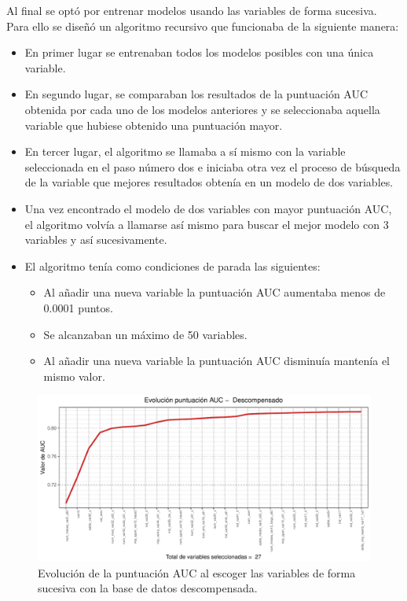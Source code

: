 \documentclass[11pt,a4paper,spanish]{article} %
\begin{document}
Al final se optó por entrenar modelos usando las variables de forma sucesiva. Para ello se diseñó un algoritmo recursivo que funcionaba de la siguiente manera:

\begin{itemize}

	\item{En primer lugar se entrenaban todos los modelos posibles con una única variable.}
	
	\item{En segundo lugar, se comparaban los resultados de la puntuación AUC obtenida por cada uno de los modelos anteriores y se seleccionaba aquella variable que hubiese obtenido una puntuación mayor.}
	
	\item{En tercer lugar, el algoritmo se llamaba a sí mismo con la variable seleccionada en el paso número dos e iniciaba otra vez el proceso de búsqueda de la variable que mejores resultados obtenía en un modelo de dos variables.}
	
	\item{Una vez encontrado el modelo de dos variables con mayor puntuación AUC, el algoritmo volvía a llamarse así mismo para buscar el mejor modelo con 3 variables y así sucesivamente.}
	
	\item{El algoritmo tenía como condiciones de parada las siguientes:}
		\begin{itemize} 
			\item{Al añadir una nueva variable la puntuación AUC aumentaba menos de 0.0001 puntos.}
			\item{Se alcanzaban un máximo de 50 variables.}
			\item{Al añadir una nueva variable la puntuación AUC disminuía mantenía el mismo valor.}
		\end{itemize}
\end{itemize}





\begin{figure}[h!]
	\begin{center}
	\includegraphics[width=\textwidth]{Z_02_01_Descompensado.pdf}
    \caption{Evolución de la puntuación AUC al escoger las variables de forma sucesiva con la base de datos descompensada.}
    \end{center}
\end{figure}
\end{document}
